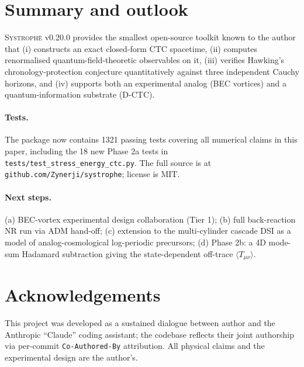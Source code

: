 \documentclass[11pt,a4paper]{article}
\begin{document}
\section{Summary and outlook}

\textsc{Systroph\=e} v0.20.0 provides the smallest open-source toolkit
known to the author that (i) constructs an exact closed-form CTC
spacetime, (ii) computes renormalised quantum-field-theoretic
observables on it, (iii) verifies Hawking's chronology-protection
conjecture quantitatively against three independent Cauchy horizons,
and (iv) supports both an experimental analog (BEC vortices) and a
quantum-information substrate (D-CTC).

\paragraph{Tests.} The package now contains 1321 passing tests
covering all numerical claims in this paper, including the 18 new
Phase 2a tests in \texttt{tests/test\_stress\_energy\_ctc.py}. The
full source is at \texttt{github.com/Zynerji/systrophe}; license is
MIT.

\paragraph{Next steps.} (a) BEC-vortex experimental design
collaboration (Tier 1); (b) full back-reaction NR run via ADM
hand-off; (c) extension to the multi-cylinder cascade DSI as a model
of analog-cosmological log-periodic precursors; (d) Phase 2b: a 4D
mode-sum Hadamard subtraction giving the state-dependent off-trace
$\langle T_{\mu\nu} \rangle$.

\section*{Acknowledgements}

This project was developed as a sustained dialogue between author
and the Anthropic ``Claude'' coding assistant; the codebase reflects
their joint authorship via per-commit \texttt{Co-Authored-By}
attribution. All physical claims and the experimental design are
the author's.


\end{document}
